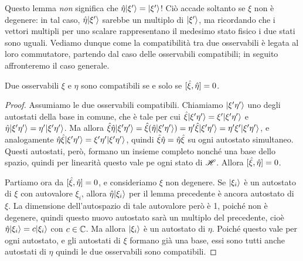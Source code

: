 Questo lemma \emph{non} significa che $\hat{\eta}\lvert\xi'\rangle=\lvert\xi'\rangle$!
Ciò accade soltanto se $\xi$ non è degenere: in tal caso, $\hat{\eta}\lvert\xi'\rangle$ sarebbe un multiplo di $\lvert\xi'\rangle$, ma ricordando che i vettori multipli per uno scalare rappresentano il medesimo stato fisico i due stati sono uguali.
Vediamo dunque come la compatibilità tra due osservabili è legata al loro commutatore, partendo dal caso delle osservabili compatibili; in seguito affronteremo il caso generale.
\begin{teorema} \label{t:osservabili-compatibili}
	Due osservabili $\xi$ e $\eta$ sono compatibili se e solo se $[\hat{\xi},\hat{\eta}]=0$.
\end{teorema}
\begin{proof}
	Assumiamo le due osservabili compatibili.
	Chiamiamo $\lvert\xi'\eta'\rangle$ uno degli autostati della base in comune, che è tale per cui $\hat{\xi}\lvert\xi'\eta'\rangle=\xi'\lvert\xi'\eta'\rangle$ e $\hat{\eta}\lvert\xi'\eta'\rangle=\eta'\lvert\xi'\eta'\rangle$.
	Ma allora $\hat{\xi}\hat{\eta}\lvert\xi'\eta'\rangle=\hat{\xi}(\hat{\eta}\lvert\xi'\eta'\rangle)=\eta'\hat{\xi}\lvert\xi'\eta'\rangle=\eta'\xi'\lvert\xi'\eta'\rangle$, e analogamente $\hat{\eta}\hat{\xi}\lvert\xi'\eta'\rangle=\xi'\eta'\lvert\xi'\eta'\rangle$, quindi $\hat{\xi}\hat{\eta}=\hat{\eta}\hat{\xi}$ su ogni autostato simultaneo.
	Questi autostati, però, formano un insieme completo nonch\'e una base dello spazio, quindi per linearità questo vale pe ogni stato di $\mathscr H$.
	Allora $[\hat{\xi},\hat{\eta}]=0$.

	Partiamo ora da $[\hat{\xi},\hat{\eta}]=0$, e consideriamo $\xi$ non degenere.
	Se $\lvert\xi_i\rangle$ è un autostato di $\xi$ con autovalore $\xi_i$, allora $\hat{\eta}\lvert\xi_i\rangle$ per il lemma precedente è ancora autostato di $\xi$.
	La dimensione dell'autospazio di tale autovalore però è 1, poich\'e non è degenere, quindi questo nuovo autostato sarà un multiplo del precedente, cioè $\hat{\eta}\lvert\xi_i\rangle=c\lvert\xi_i\rangle$ con $c\in\mathbb{C}$.
	Ma allora $\lvert\xi_i\rangle$ è un autostato di $\eta$.
	Poich\'e questo vale per ogni autostato, e gli autostati di $\xi$ formano già una base, essi sono tutti anche autostati di $\eta$ quindi le due osservabili sono compatibili.


\end{proof}
